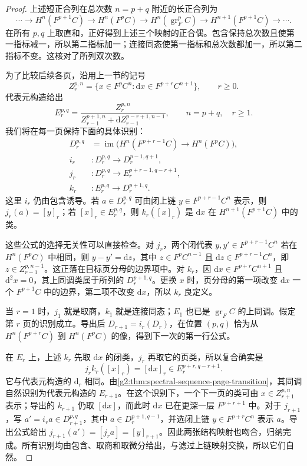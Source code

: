 \begin{proof}
	上述短正合列在总次数 \(n=p+q\) 附近的长正合列为
	\[
		\cdots\longrightarrow H^n(F^{p+1}C)\longrightarrow H^n(F^pC)
		\longrightarrow H^n(\operatorname{gr}_F^pC)\longrightarrow H^{n+1}(F^{p+1}C)\longrightarrow\cdots.
	\]
	在所有 \(p,q\) 上取直和，正好得到上述三个映射的正合偶。包含保持总次数且使第一指标减一，所以第二指标加一；连接同态使第一指标和总次数都加一，所以第二指标不变。这核对了所列双次数。

	为了比较后续各页，沿用上一节的记号
	\[
		Z_r^{p,n}=\{x\in F^pC^n:\mathrm dx\in F^{p+r}C^{n+1}\},\qquad r\ge0.
	\]
	代表元构造给出
	\[
		E_r^{p,q}=\frac{Z_r^{p,n}}{Z_{r-1}^{p+1,n}+\mathrm dZ_{r-1}^{p-r+1,n-1}},\qquad n=p+q,\quad r\ge1.
	\]
	我们将在每一页保持下面的具体识别：
	\begin{equation}\label{g2:eq:derived-filtered-couple}
	\begin{aligned}
		D_r^{p,q}&=\operatorname{im}\bigl(H^n(F^{p+r-1}C)\longrightarrow H^n(F^pC)\bigr),\\
		i_r&:D_r^{p,q}\longrightarrow D_r^{p-1,q+1},\\
		j_r&:D_r^{p,q}\longrightarrow E_r^{p+r-1,q-r+1},\\
		k_r&:E_r^{p,q}\longrightarrow D_r^{p+1,q}.
	\end{aligned}
	\end{equation}
	这里 \(i_r\) 仍由包含诱导。若 \(a\in D_r^{p,q}\) 可由闭上链 \(y\in F^{p+r-1}C^n\) 表示，则 \(j_r(a)=[y]_r\)；若 \([x]_r\in E_r^{p,q}\)，则 \(k_r([x]_r)\) 是 \(\mathrm dx\) 在 \(H^{n+1}(F^{p+1}C)\) 中的类。

	这些公式的选择无关性可以直接检查。对 \(j_r\)，两个闭代表 \(y,y'\in F^{p+r-1}C^n\) 若在 \(H^n(F^pC)\) 中相同，则 \(y-y'=\mathrm dz\)，其中 \(z\in F^pC^{n-1}\) 且 \(\mathrm dz\in F^{p+r-1}C^n\)，即 \(z\in Z_{r-1}^{p,n-1}\)。这正落在目标页分母的边界项中。对 \(k_r\)，因 \(\mathrm dx\in F^{p+r}C^{n+1}\) 且 \(\mathrm d^2x=0\)，其上同调类属于所列的 \(D_r^{p+1,q}\)。更换 \(x\) 时，页分母的第一项改变 \(\mathrm dx\) 一个 \(F^{p+1}C\) 中的边界，第二项不改变 \(\mathrm dx\)，所以 \(k_r\) 良定义。

	当 \(r=1\) 时，\(j_1\) 就是取商，\(k_1\) 就是连接同态；\(E_1\) 也已是 \(\operatorname{gr}_F C\) 的上同调。假定第 \(r\) 页的识别成立。导出后 \(D_{r+1}=i_r(D_r)\)，在位置 \((p,q)\) 恰为从 \(H^n(F^{p+r}C)\) 到 \(H^n(F^pC)\) 的像，得到下一次的第一行公式。

	在 \(E_r\) 上，上述 \(k_r\) 先取 \(\mathrm dx\) 的闭类，\(j_r\) 再取它的页类，所以复合确实是
	\[
		j_rk_r([x]_r)=[\mathrm dx]_r\in E_r^{p+r,q-r+1}.
	\]
	它与代表元构造的 \(\mathrm d_r\) 相同。由\cref{g2:thm:spectral-sequence-page-transition}，其同调自然识别为代表元构造的 \(E_{r+1}\)。在这个识别下，一个下一页的类可由 \(x\in Z_{r+1}^{p,n}\) 表示；导出的 \(k_{r+1}\) 仍取 \([\mathrm dx]\)，而此时 \(\mathrm dx\) 已在更深一层 \(F^{p+r+1}\) 中。对于 \(j_{r+1}\)，写 \(a'=i_ra\in D_{r+1}^{p,q}\)，其中 \(a\in D_r^{p+1,q-1}\)，并选闭上链 \(y\in F^{p+r}C^n\) 表示 \(a\)。导出公式给出 \(j_{r+1}(a')=[j_ra]=[y]_{r+1}\)。因此两张结构映射也吻合，归纳完成。所有识别均由包含、取商和取微分给出，与滤过上链映射交换，所以它们自然。
\end{proof}

